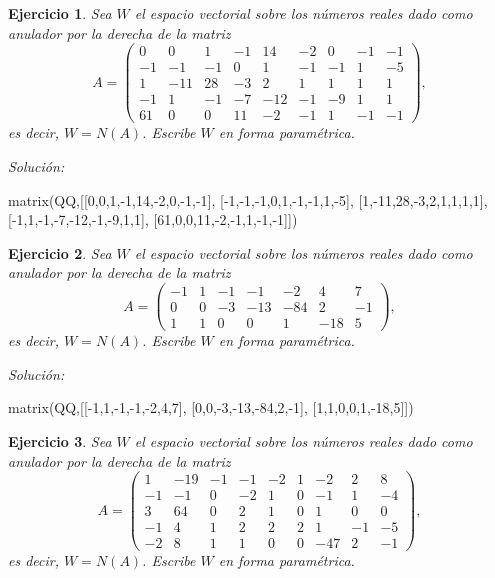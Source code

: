 \documentclass{amsart}
\newtheorem{ejer}{Ejercicio}
\begin{document}


\begin{ejer} Sea $W$ el espacio vectorial sobre los números reales dado
como anulador por la derecha de la matriz 
\[A = \left(\begin{array}{rrrrrrrrr}
0 & 0 & 1 & -1 & 14 & -2 & 0 & -1 & -1 \\
-1 & -1 & -1 & 0 & 1 & -1 & -1 & 1 & -5 \\
1 & -11 & 28 & -3 & 2 & 1 & 1 & 1 & 1 \\
-1 & 1 & -1 & -7 & -12 & -1 & -9 & 1 & 1 \\
61 & 0 & 0 & 11 & -2 & -1 & 1 & -1 & -1
\end{array}\right),\]
es decir, $W = N(A)$. Escribe $W$ en forma param\'etrica.
\end{ejer}

{\it Soluci\'on:}

\begin{sageblock}
matrix(QQ,[[0,0,1,-1,14,-2,0,-1,-1],
[-1,-1,-1,0,1,-1,-1,1,-5],
[1,-11,28,-3,2,1,1,1,1],
[-1,1,-1,-7,-12,-1,-9,1,1],
[61,0,0,11,-2,-1,1,-1,-1]])
\end{sageblock}



\begin{ejer} Sea $W$ el espacio vectorial sobre los números reales dado
como anulador por la derecha de la matriz 
\[A = \left(\begin{array}{rrrrrrr}
-1 & 1 & -1 & -1 & -2 & 4 & 7 \\
0 & 0 & -3 & -13 & -84 & 2 & -1 \\
1 & 1 & 0 & 0 & 1 & -18 & 5
\end{array}\right),\]
es decir, $W = N(A)$. Escribe $W$ en forma param\'etrica.
\end{ejer}

{\it Soluci\'on:}

\begin{sageblock}
matrix(QQ,[[-1,1,-1,-1,-2,4,7],
[0,0,-3,-13,-84,2,-1],
[1,1,0,0,1,-18,5]])
\end{sageblock}



\begin{ejer} Sea $W$ el espacio vectorial sobre los números reales dado
como anulador por la derecha de la matriz 
\[A = \left(\begin{array}{rrrrrrrrr}
1 & -19 & -1 & -1 & -2 & 1 & -2 & 2 & 8 \\
-1 & -1 & 0 & -2 & 1 & 0 & -1 & 1 & -4 \\
3 & 64 & 0 & 2 & 1 & 0 & 1 & 0 & 0 \\
-1 & 4 & 1 & 2 & 2 & 2 & 1 & -1 & -5 \\
-2 & 8 & 1 & 1 & 0 & 0 & -47 & 2 & -1
\end{array}\right),\]
es decir, $W = N(A)$. Escribe $W$ en forma param\'etrica.
\end{ejer}
\end{document}
